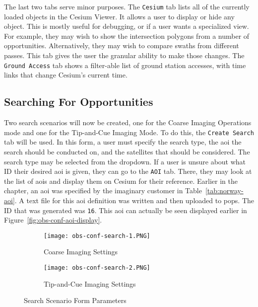 The last two tabs serve minor purposes. The \texttt{Cesium} tab lists all of
the currently loaded objects in the Cesium Viewer. It allows a user to display
or hide any object. This is mostly useful for debugging, or if a user wants a
specialized view. For example, they may wish to show the intersection polygons
from a number of opportunities. Alternatively, they may wish to compare swaths
from different passes. This tab gives the user the granular ability to make
those changes. The \texttt{Ground Access} tab shows a filter-able list of
ground station accesses, with time links that change Cesium's current time.


\subsection{Searching For Opportunities}

Two search scenarios will now be created, one for the Coarse Imaging Operations
mode and one for the Tip-and-Cue Imaging Mode. To do this, the \texttt{Create
Search} tab will be used. In this form, a user must specify the search type,
the \gls{aoi} the search should be conducted on, and the  satellites that
should be considered.  The search type may be selected from the dropdown. If a
user is unsure about what ID their desired \gls{aoi} is given, they can go to
the \texttt{AOI} tab.  There, they may look at the list of \glspl{aoi} and
display them on Cesium for their reference. Earlier in the chapter, an
\gls{aoi} was specified by the imaginary customer in
Table~\ref{tab:norway-aoi}. A text file for this \gls{aoi} definition was
written and then uploaded to \gls{pops}. The ID that was generated was
\texttt{16}. This \gls{aoi} can actually be seen displayed earlier in
Figure~\ref{fig:obs-conf-aoi-display}.

\begin{figure}[h]
    \centering
    \begin{subfigure}[b]{0.49\textwidth}
	\centering
	\texttt{[image: obs-conf-search-1.PNG]} 
	\caption{Coarse Imaging Settings}
	\label{fig:obs-conf-search-1} 
    \end{subfigure}
    \hfill
    \begin{subfigure}[b]{0.49\textwidth}
	\centering
	\texttt{[image: obs-conf-search-2.PNG]} 
	\caption{Tip-and-Cue Imaging Settings}
	\label{fig:obs-conf-search-2} 
    \end{subfigure}
    \caption{Search Scenario Form Parameters}
    \label{fig:obs-conf-searches} 
\end{figure}


